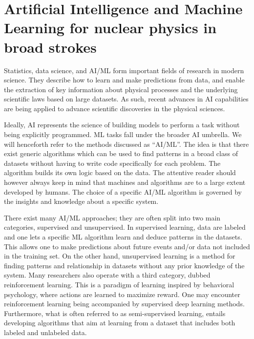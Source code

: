 \documentclass[../../main/main.tex]{subfiles}
\begin{document}
\section{Artificial Intelligence and Machine Learning for nuclear physics in broad strokes}


 Statistics, data science, and AI/ML form important fields of research
 in modern science. They describe how to learn and make predictions
 from data, and enable the extraction of key information about
 physical processes and the underlying scientific laws based on large
 datasets. As such, recent advances in AI capabilities are being
 applied to advance scientific discoveries in the physical sciences.




Ideally, AI represents the science of building models to perform a
task without being explicitly programmed. ML tasks fall under the
broader AI umbrella. We will henceforth refer to the methods discussed
as ``AI/ML''. The idea is that there exist generic algorithms which
can be used to find patterns in a broad class of datasets without
having to write code specifically for each problem. The algorithm
builds its own logic based on the data. The attentive reader should
however always keep in mind that machines and algorithms are to a
large extent developed by humans. The choice of a specific AI/ML
algorithm is governed by the insights and knowledge about a specific
system.



There exist many AI/ML approaches; they are often split into two main
categories, supervised and unsupervised. In supervised learning, data
are labeled and one lets a specific ML algorithm learn and deduce
patterns in the datasets. This allows one to make predictions about
future events and/or data not included in the training set.  On the
other hand, unsupervised learning is a method for finding patterns and
relationship in datasets without any prior knowledge of the
system. Many researchers also operate with a third category, dubbed
reinforcement learning. This is a paradigm of learning inspired by
behavioral psychology, where actions are learned to maximize reward.
One may encounter reinforcement learning being accompanied by
supervised deep learning methods. Furthermore, what is often referred
to as semi-supervised learning, entails developing algorithms that aim
at learning from a dataset that includes both labeled and unlabeled
data.
\end{document}
